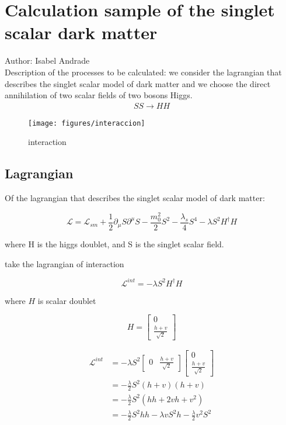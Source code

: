 \chapter{Calculation sample of the singlet scalar dark matter}

Author: Isabel Andrade\\

Description of the processes to be calculated: we consider the lagrangian that describes the singlet scalar model of dark matter and we choose the direct annihilation of two scalar fields of two bosons Higgs.\\

\begin{align}
  SS \to HH
\end{align}

\begin{figure}
  \centering
  \texttt{[image: figures/interaccion]}
  \caption{interaction}
\end{figure}

\section{Lagrangian}

Of the lagrangian that describes the singlet scalar model of dark matter:

\begin{equation}
  \mathcal{L}=\mathcal{L}_{sm} + \frac{1}{2} \partial_\mu S\partial^\mu S -\frac{m_0 ^2}{2} S^2 - \frac{\lambda_s}{4} S^4 - \lambda S^2H^\dagger H
\end{equation}

where H is the higgs doublet, and S is the singlet scalar field.

take the lagrangian of interaction

\begin{equation}
  \mathcal{L}^{int} = - \lambda S^2 H^\dagger H
\end{equation}

where $H$ is scalar doublet

\begin{equation}
  H=\begin{bmatrix}{0}\\{\frac{h+{v}}{\sqrt{2}}}\end{bmatrix}
\end{equation}

\begin{align}
    \mathcal{L}^{int} & ={ - \lambda S^2 \begin{bmatrix}{0}&{\frac{h+{v}}{\sqrt{2}}}\end{bmatrix} \begin{bmatrix}{0}\\{\frac{h+{v}}{\sqrt{2}}}\end{bmatrix}}\\  
    & =  {- \frac{\lambda}{2} S^2 (h+{v})(h+{v})}\\
    & = {-\frac{\lambda}{2} S^2 (hh+2 {v} h + {v^2})}\\
    & = {-\frac{\lambda}{2} S^2hh - \lambda {v} S^2 h -\frac{\lambda}{2} {v^2} S^2}
\end{align}


